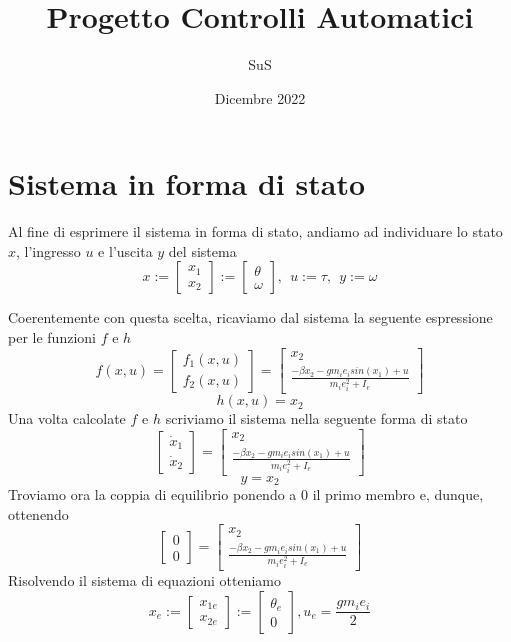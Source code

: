 \documentclass{article}
\title{Progetto Controlli Automatici}
\author{SuS}
\date{Dicembre 2022}
\begin{document}
\maketitle

\section{Sistema in forma di stato}
Al fine di esprimere il sistema in forma di stato, andiamo ad individuare lo stato $x$, l'ingresso $u$ e l'uscita $y$ del sistema
$$
x := \left[\begin{matrix} x_1\\ x_2\end{matrix}\right] := \left[\begin{matrix} \theta \\ \omega\end{matrix}\right], \ \ u:= \tau, \ \ y:= \omega
$$

Coerentemente con questa scelta, ricaviamo dal sistema la seguente espressione per le funzioni $f$ e $h$
$$
f(x,u) = \left[\begin{matrix} f_1(x,u)\\ f_2(x,u)\end{matrix}\right] = \left[\begin{matrix} x_2 \\ \frac{-\beta x_2-g m_i e_i sin(x_1)+ u}{m_i e_i^2 + I_e} \end{matrix}\right] 
$$
$$
h(x,u) = x_2
$$
Una volta calcolate $f$ e $h$ scriviamo il sistema nella seguente forma di stato
$$
\left[\begin{matrix} \dot x_1\\ \dot x_2\end{matrix}\right] = 
\left[\begin{matrix} x_2 \\ \frac{-\beta x_2-g m_i e_i sin(x_1)+ u}{m_i e_i^2 + I_e} \end{matrix}\right] 
$$
$$
y = x_2
$$
Troviamo ora la coppia di equilibrio ponendo a 0 il primo membro e, dunque, ottenendo
$$
\left[\begin{matrix} 0\\ 0\end{matrix}\right] = 
\left[\begin{matrix} x_2 \\ \frac{-\beta x_2-g m_i e_i sin(x_1)+ u}{m_i e_i^2 + I_e} \end{matrix}\right] 
$$
Risolvendo il sistema di equazioni otteniamo
$$
x_e := \left[\begin{matrix} x_{1e}\\ x_{2e}\end{matrix}\right] :=
\left[\begin{matrix} \theta_e \\ 0\end{matrix}\right], 
u_e= \frac{g m_i e_i}{2}
$$
\end{document}
